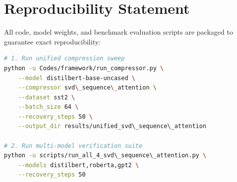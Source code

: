 \section{Reproducibility Statement}
All code, model weights, and benchmark evaluation scripts are packaged to guarantee exact reproducibility:
\begin{lstlisting}[language=bash]
# 1. Run unified compression sweep
python -u Codes/framework/run_compressor.py \
    --model distilbert-base-uncased \
    --compressor svd\_sequence\_attention \
    --dataset sst2 \
    --batch_size 64 \
    --recovery_steps 50 \
    --output_dir results/unified_svd\_sequence\_attention

# 2. Run multi-model verification suite
python -u scripts/run_all_4_svd\_sequence\_attention.py \
    --models distilbert,roberta,gpt2 \
    --recovery_steps 50
\end{lstlisting}
